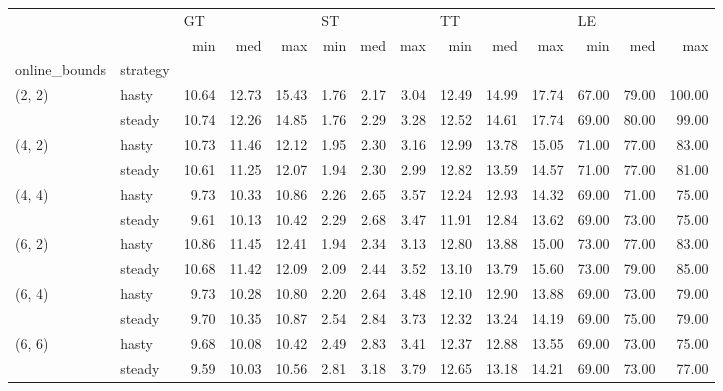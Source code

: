 \begin{tabular}{llrrrrrrrrrrrr}
\toprule
       &        & \multicolumn{3}{l}{GT} & \multicolumn{3}{l}{ST} & \multicolumn{3}{l}{TT} & \multicolumn{3}{l}{LE} \\
       &        &   min &   med &   max &  min &  med &  max &   min &   med &   max &   min &   med &    max \\
online\_bounds & strategy &       &       &       &      &      &      &       &       &       &       &       &        \\
\midrule
(2, 2) & hasty & 10.64 & 12.73 & 15.43 & 1.76 & 2.17 & 3.04 & 12.49 & 14.99 & 17.74 & 67.00 & 79.00 & 100.00 \\
       & steady & 10.74 & 12.26 & 14.85 & 1.76 & 2.29 & 3.28 & 12.52 & 14.61 & 17.74 & 69.00 & 80.00 &  99.00 \\
(4, 2) & hasty & 10.73 & 11.46 & 12.12 & 1.95 & 2.30 & 3.16 & 12.99 & 13.78 & 15.05 & 71.00 & 77.00 &  83.00 \\
       & steady & 10.61 & 11.25 & 12.07 & 1.94 & 2.30 & 2.99 & 12.82 & 13.59 & 14.57 & 71.00 & 77.00 &  81.00 \\
(4, 4) & hasty &  9.73 & 10.33 & 10.86 & 2.26 & 2.65 & 3.57 & 12.24 & 12.93 & 14.32 & 69.00 & 71.00 &  75.00 \\
       & steady &  9.61 & 10.13 & 10.42 & 2.29 & 2.68 & 3.47 & 11.91 & 12.84 & 13.62 & 69.00 & 73.00 &  75.00 \\
(6, 2) & hasty & 10.86 & 11.45 & 12.41 & 1.94 & 2.34 & 3.13 & 12.80 & 13.88 & 15.00 & 73.00 & 77.00 &  83.00 \\
       & steady & 10.68 & 11.42 & 12.09 & 2.09 & 2.44 & 3.52 & 13.10 & 13.79 & 15.60 & 73.00 & 79.00 &  85.00 \\
(6, 4) & hasty &  9.73 & 10.28 & 10.80 & 2.20 & 2.64 & 3.48 & 12.10 & 12.90 & 13.88 & 69.00 & 73.00 &  79.00 \\
       & steady &  9.70 & 10.35 & 10.87 & 2.54 & 2.84 & 3.73 & 12.32 & 13.24 & 14.19 & 69.00 & 75.00 &  79.00 \\
(6, 6) & hasty &  9.68 & 10.08 & 10.42 & 2.49 & 2.83 & 3.41 & 12.37 & 12.88 & 13.55 & 69.00 & 73.00 &  75.00 \\
       & steady &  9.59 & 10.03 & 10.56 & 2.81 & 3.18 & 3.79 & 12.65 & 13.18 & 14.21 & 69.00 & 73.00 &  77.00 \\
\bottomrule
\end{tabular}
